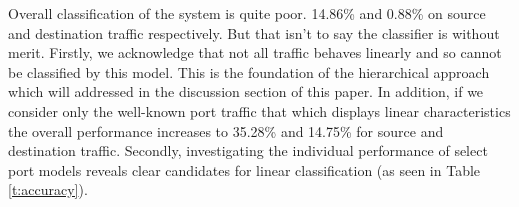 Overall classification of the system is quite poor. 14.86\% and 0.88\% on source and destination traffic respectively. But that isn't to say the classifier is without merit. Firstly, we acknowledge that not all traffic behaves linearly and so cannot be classified by this model. This is the foundation of the hierarchical approach which will addressed in the discussion section of this paper. In addition, if we consider only the well-known port traffic that which displays linear characteristics the overall performance increases to 35.28\% and 14.75\% for source and destination traffic. Secondly, investigating the individual performance of select port models reveals clear candidates for linear classification (as seen in Table \ref{t:accuracy}).


